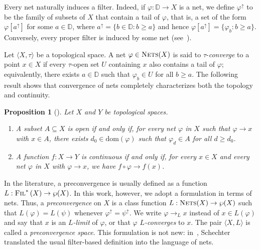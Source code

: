 \documentclass{amsart}
\newcommand{\Fil}[1]{\textsc{Fil}^*\left(#1\right)}
\newtheorem{proposition}{Proposition}[section]
\theoremstyle{definition}
\theoremstyle{remark}
\numberwithin{equation}{section}
\begin{document}
Every net naturally induces a filter. Indeed, if $\varphi\colon\mathbb{D}\to X$ is a net, we define $\varphi^{\uparrow}$ to be the family of subsets of $X$ that contain a tail of $\varphi$, that is, a set of the form $\varphi[a^{\uparrow}]$ for some $a\in\mathbb{D}$, where $a^{\uparrow}=\{b\in\mathbb{D}: b\geq a\}$ and hence $\varphi[a^{\uparrow}]=\{\varphi_b: b\geq a\}$. Conversely, every proper filter is induced by some net (see~\cite{nettopology}).

Let $\langle X,\tau\rangle$ be a topological space. A net $\varphi\in\textsc{Nets}(X)$ is said to $\tau$-\emph{converge} to a point $x\in X$ if every $\tau$-open set $U$ containing $x$ also contains a tail of $\varphi$; equivalently, there exists $a\in\mathbb{D}$ such that $\varphi_b\in U$ for all $b\geq a$. The following result shows that convergence of nets completely characterizes both the topology and continuity.

\begin{proposition}[{\cite[Propositions 1.2.2 and 1.2.3]{monteiro2024algebraictopologyopensets}}]
	\label{opencont}
	Let $X$ and $Y$ be topological spaces.
	\begin{enumerate}
		\item A subset $A\subseteq X$ is open if and only if, for every net
		$\varphi$ in $X$ such that $\varphi\to x$ with $x\in A$, there exists
		$d_0\in\mathrm{dom}(\varphi)$ such that $\varphi_d\in A$ for all
		$d\ge d_0$.
		
		\item A function $f:X\to Y$ is continuous if and only if, for every
		$x\in X$ and every net $\varphi$ in $X$ with $\varphi\to x$, we have
		$f\circ\varphi\to f(x)$.
	\end{enumerate}
\end{proposition}

In the literature, a preconvergence is usually defined as a function $L:\Fil{X}\to\wp(X)$. In this work, however, we adopt a formulation in terms of nets. Thus, a \emph{preconvergence} on $X$ is a class function $L:\textsc{Nets}(X)\to\wp(X)$ such that $L(\varphi)=L(\psi)$ whenever $\varphi^{\uparrow}=\psi^{\uparrow}$. We write $\varphi\to_L x$ instead of $x\in L(\varphi)$ and say that $x$ is an \emph{$L$-limit} of $\varphi$, or that $\varphi$ \emph{$L$-converges} to $x$. The pair $\langle X,L\rangle$ is called a \emph{preconvergence space}. This formulation is not new: in~\cite{schechter}, Schechter translated the usual filter-based definition into the language of nets.
\end{document}
